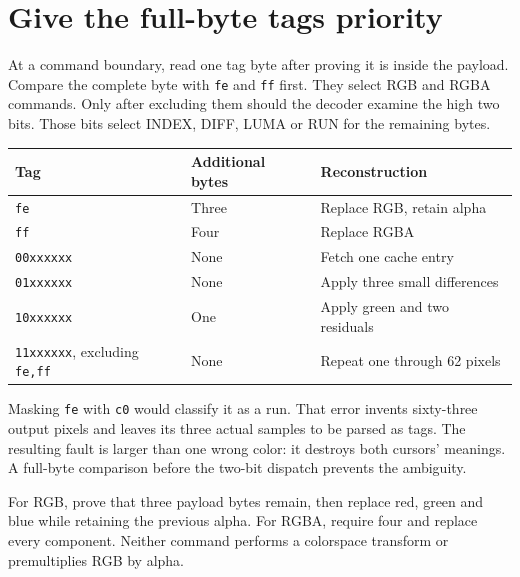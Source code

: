 \section{Give the full-byte tags priority}
At a command boundary, read one tag byte after proving it is inside the payload. Compare
the complete byte with \texttt{fe} and \texttt{ff} first. They select RGB and RGBA
commands. Only after excluding them should the decoder examine the high two bits.
Those bits select INDEX, DIFF, LUMA or RUN for the remaining bytes.

\begin{center}
\begin{tabular}{lll}
Tag & Additional bytes & Reconstruction \\
\hline
\texttt{fe} & Three & Replace RGB, retain alpha \\
\texttt{ff} & Four & Replace RGBA \\
\texttt{00xxxxxx} & None & Fetch one cache entry \\
\texttt{01xxxxxx} & None & Apply three small differences \\
\texttt{10xxxxxx} & One & Apply green and two residuals \\
\texttt{11xxxxxx}, excluding \texttt{fe,ff} & None & Repeat one through 62 pixels \\
\end{tabular}
\end{center}

Masking \texttt{fe} with \texttt{c0} would classify it as a run. That error invents
sixty-three output pixels and leaves its three actual samples to be parsed as tags.
The resulting fault is larger than one wrong color: it destroys both cursors' meanings.
A full-byte comparison before the two-bit dispatch prevents the ambiguity.

For RGB, prove that three payload bytes remain, then replace red, green and blue while
retaining the previous alpha. For RGBA, require four and replace every component.
Neither command performs a colorspace transform or premultiplies RGB by alpha.
